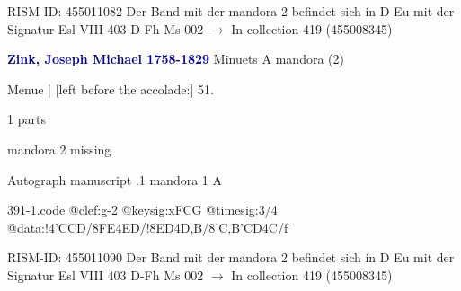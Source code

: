 \documentclass[twocolumn]{book}
\begin{document}
\newline RISM-ID: 455011082
\newline Der Band mit der mandora 2 befindet sich in D Eu mit der Signatur Esl VIII 403
\newline D-Fh  Ms 002
\newline $\rightarrow$ In collection 419 (455008345)

\newline \par \vspace{7pt} \textcolor{darkblue}{\textbf{Zink, Joseph Michael  1758-1829}}
\newline Minuets  A  
\newline mandora (2)
\newline \begin{itshape}[f.27r, at left:] Menue | [left before the accolade:] 51.\end{itshape} 
\newline \textcolor{darkblue}{}  1 parts  
\newline \begin{small} mandora 2 missing\end{small} 
\newline Autograph manuscript
.1  mandora 1  A  
\begin{filecontents*}{391-1.code}
@clef:g-2
@keysig:xFCG
@timesig:3/4
@data:!4'CCD/{8FE}4ED/!{8ED}4D,B/{8'C,B}{'CD}4C/f
\end{filecontents*}
\newline
%

\newline RISM-ID: 455011090
\newline Der Band mit der mandora 2 befindet sich in D Eu mit der Signatur Esl VIII 403
\newline D-Fh  Ms 002
\newline $\rightarrow$ In collection 419 (455008345)
\end{document}
